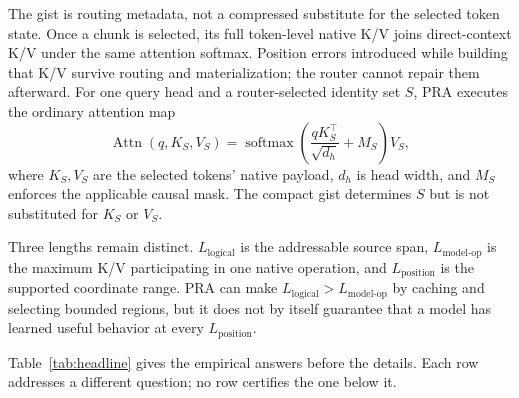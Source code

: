 \documentclass[11pt]{article}
\begin{document}
The gist is routing metadata, not a compressed substitute for the selected token state.
Once a chunk is selected, its full token-level native K/V joins direct-context K/V under the
same attention softmax. Position errors introduced while building that K/V survive routing
and materialization; the router cannot repair them afterward.
For one query head and a router-selected identity set $S$, PRA executes the ordinary attention
map
\begin{equation}
  \operatorname{Attn}(q,K_S,V_S)
  =\operatorname{softmax}\!\left(\frac{qK_S^{\top}}{\sqrt{d_h}}+M_S\right)V_S,
  \label{eq:pra-attention}
\end{equation}
where $K_S,V_S$ are the selected tokens' native payload, $d_h$ is head width, and $M_S$
enforces the applicable causal mask. The compact gist determines $S$ but is not substituted
for $K_S$ or $V_S$.

Three lengths remain distinct. $L_{\mathrm{logical}}$ is the addressable source span,
$L_{\mathrm{model\mbox{-}op}}$ is the maximum K/V participating in one native operation,
and $L_{\mathrm{position}}$ is the supported coordinate range. PRA can make
$L_{\mathrm{logical}}>L_{\mathrm{model\mbox{-}op}}$ by caching and selecting bounded regions,
but it does not by itself guarantee that a model has learned useful behavior at every
$L_{\mathrm{position}}$.

Table~\ref{tab:headline} gives the empirical answers before the details. Each row addresses a
different question; no row certifies the one below it.
\end{document}
